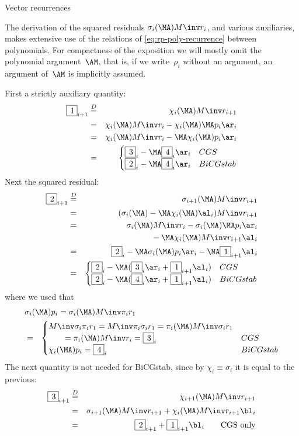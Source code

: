  {Vector recurrences}

The derivation of the squared residuals
$\sigma_i(\MA)M\inv r_i$, and various auxiliaries,
makes extensive use of the relations of \eqref{eq:rp-poly-recurrence}
between polynomials.
For compactness of the exposition we will mostly omit
the polynomial argument~$\AM$, that is, if we write~$\rho_i$ without
an argument, an argument of~$\AM$ is implicitly assumed.

First a strictly auxiliary quantity:
\begin{eqnarray*}
	\B1{i+1}&\buildrel D\over=&\chi_i(\MA)M\inv r_{i+1}\\
	&=&   \chi_i(\MA)M\inv r_i-\chi_i(\MA)\MA p_i\ar_i\\
	&=&	\chi_i(\MA)M\inv r_i-\MA\chi_i(\MA)p_i\ar_i \\
	&=&	\begin{cases} \B3i-\MA\B4i\ar_i&CGS\cr
			\B2i-\MA\B4i\ar_i&BiCGstab\cr\end{cases}
	\end{eqnarray*}
Next the squared residual:
\begin{eqnarray*}
\B2{i+1}&\buildrel D\over=&\sigma_{i+1}(\MA)M\inv r_{i+1}\\
	&=&	 (\sigma_i(\MA)-\MA\chi_i(\MA)\al_i)M\inv r_{i+1}\\
	&=&	\sigma_i(\MA)M\inv r_i-\sigma_i(\MA)\MA p_i\ar_i\\
	& &		\hphantom{\sigma_i(\MA)M\inv r_i}
		-\MA\chi_i(\MA)M\inv r_{i+1}\al_i\\
	&=&	\B2i-\MA\sigma_i(\MA)p_i\ar_i-\MA\B1{i+1}\al_i\\
	&=&\begin{cases}
		\B2i-\MA(\B3i\ar_i+\B1{i+1}\al_i)&CGS\cr
		\B2i-\MA(\B4i\ar_i+\B1{i+1}\al_i)&BiCGstab\cr\end{cases}
	\end{eqnarray*}
where we used that
\begin{eqnarray*}
    &\rlap{$\sigma_i(\MA)p_i=\sigma_i(\MA)M\inv\pi_ir_1$}\\
    &=&\begin{cases}M\inv\sigma_i\pi_ir_1=M\inv\pi_i\sigma_ir_1
                         =\pi_i(\MA)M\inv\sigma_ir_1\cr
              \qquad=\pi_i(\MA)M\inv r_i=\B3i    &CGS\cr
              \chi_i(\MA)p_i=\B4i	&BiCGstab\cr\end{cases}
\end{eqnarray*}
The next quantity is not needed for BiCGstab, since 
by $\chi_i\equiv\sigma_i$ it is equal to the previous:
\begin{eqnarray*}
\B3{i+1}&\buildrel D\over=&
		\chi_{i+1}(\MA)M\inv r_{i+1}\\
	&=&	\sigma_{i+1}(\MA)M\inv r_{i+1}
			+\chi_i(\MA)M\inv r_{i+1}\bl_i\\
	&=&	\B2{i+1}+\B1{i+1}\bl_i
			\qquad\hbox{CGS only}
	\end{eqnarray*}
